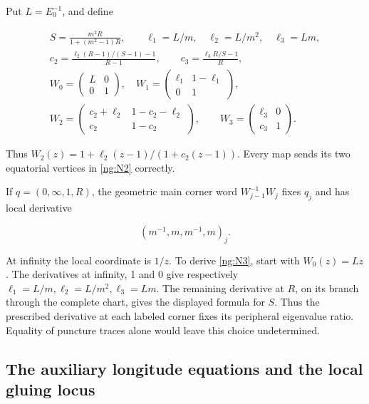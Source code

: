 Put \(L=E_0^{-1}\), and define

\begin{equation}\label{ng:N3}
\begin{gathered}
 S=\frac{m^2R}{1+(m^2-1)R},\qquad
 \ell_1=L/m,\quad \ell_2=L/m^2,\quad \ell_3=Lm,\\
 c_2=\frac{\ell_2(R-1)/(S-1)-1}{R-1},\qquad
 c_3=\frac{\ell_3R/S-1}{R},\\
 W_0=\begin{pmatrix}L&0\\0&1\end{pmatrix},\quad
 W_1=\begin{pmatrix}\ell_1&1-\ell_1\\0&1\end{pmatrix},\\
 W_2=\begin{pmatrix}c_2+\ell_2&1-c_2-\ell_2\\c_2&1-c_2\end{pmatrix},
 \qquad
 W_3=\begin{pmatrix}\ell_3&0\\c_3&1\end{pmatrix}.
\end{gathered}
\end{equation}

Thus \(W_2(z)=1+\ell_2(z-1)/(1+c_2(z-1))\).
Every map sends its two equatorial vertices in \eqref{ng:N2} correctly.

If \(q=(0,\infty,1,R)\), the geometric main corner word
\(W_{j-1}^{-1}W_j\) fixes \(q_j\) and has local derivative

\begin{equation}\label{ng:N4}
(m^{-1},m,m^{-1},m)_j.
\end{equation}

At infinity the local coordinate is \(1/z\). To derive \eqref{ng:N3},
start with \(W_0(z)=Lz\). The derivatives at infinity, 1 and 0
give respectively \(\ell_1=L/m,\ell_2=L/m^2,\ell_3=Lm\).
The remaining derivative at \(R\), on its branch through the
complete chart, gives the displayed formula for \(S\).
Thus the prescribed derivative at each labeled corner fixes its
peripheral eigenvalue ratio. Equality of puncture traces alone would
leave this choice undetermined.

\subsection{The auxiliary longitude equations and the local gluing locus}\label{ng:the-auxiliary-longitude-equations-and-the-local-gluing-locus}

